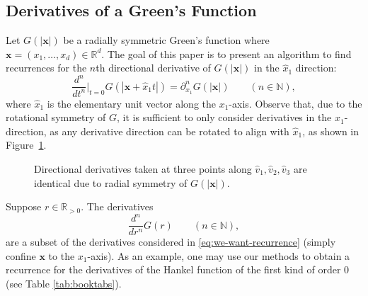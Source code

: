 \documentclass[12pt]{article}
\def\N{{\mathbb N}}
\def\R{{\mathbb R}}
\let\b=\boldsymbol
\theoremstyle{definition}
\theoremstyle{plain}
\theoremstyle{definition}
\begin{document}
\subsection{Derivatives of a Green's Function}
Let $G(|{\b x}|)$ be a radially symmetric Green's function where ${\b x} =(x_1, \dots, x_d) \in \R^d$. The goal of this paper is to present an algorithm to find recurrences for the $n$th directional derivative of $G(|\b{x}|)$ in the $\hat{x}_1$ direction:
\begin{equation}
\label{eq:we-want-recurrence}
\frac{d^n}{dt^n}|_{t=0} G(|{\b x} + \hat{x}_1 t|) = \partial^n_{x_1} G(|{\b x}|) \qquad  (n \in \N),
\end{equation}
where $\hat{x}_1$ is the elementary unit vector along the $x_1$-axis. Observe that, due to the rotational symmetry of $G$, it is sufficient to only consider derivatives in the $\hat{x}_1$-direction, as any derivative direction can be rotated to align with $\hat{x}_1$, as shown in Figure~\ref{fig:rotational-sym}.

\begin{figure}[!ht]

\centering
{}

\caption{Directional derivatives taken at three points along $\hat{v}_1, \hat{v}_2, \hat{v}_3$ are identical due to radial symmetry of $G(|\b{x}|)$.}
\label{fig:rotational-sym}
\end{figure}

Suppose $r \in \R_{ > 0}$. The derivatives
\[
\frac{d^n}{dr^n} G(r) \qquad  (n \in \N),
\]
are a subset of the derivatives considered in \eqref{eq:we-want-recurrence} (simply confine ${\b x}$ to the $x_1$-axis). As an example, one may use our methods to obtain a recurrence for the derivatives of the Hankel function of the first kind of order 0 (see Table \ref{tab:booktabs}).
\end{document}
